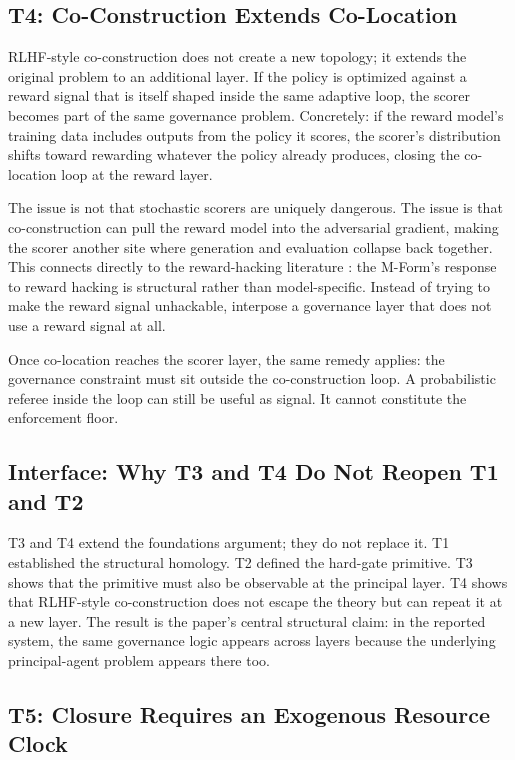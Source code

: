 \documentclass[11pt]{article}
\begin{document}
\subsection{T4: Co-Construction Extends Co-Location}

RLHF-style co-construction does not create a new topology; it extends the original problem to an additional layer. If the policy is optimized against a reward signal that is itself shaped inside the same adaptive loop, the scorer becomes part of the same governance problem. Concretely: if the reward model's training data includes outputs from the policy it scores, the scorer's distribution shifts toward rewarding whatever the policy already produces, closing the co-location loop at the reward layer.

The issue is not that stochastic scorers are uniquely dangerous. The issue is that co-construction can pull the reward model into the adversarial gradient, making the scorer another site where generation and evaluation collapse back together. This connects directly to the reward-hacking literature \citep{skalse2022,casper2023}: the M-Form's response to reward hacking is structural rather than model-specific. Instead of trying to make the reward signal unhackable, interpose a governance layer that does not use a reward signal at all.

Once co-location reaches the scorer layer, the same remedy applies: the governance constraint must sit outside the co-construction loop. A probabilistic referee inside the loop can still be useful as signal. It cannot constitute the enforcement floor.

\subsection{Interface: Why T3 and T4 Do Not Reopen T1 and T2}

T3 and T4 extend the foundations argument; they do not replace it. T1 established the structural homology. T2 defined the hard-gate primitive. T3 shows that the primitive must also be observable at the principal layer. T4 shows that RLHF-style co-construction does not escape the theory but can repeat it at a new layer. The result is the paper's central structural claim: in the reported system, the same governance logic appears across layers because the underlying principal-agent problem appears there too.

\subsection{T5: Closure Requires an Exogenous Resource Clock}
\end{document}
